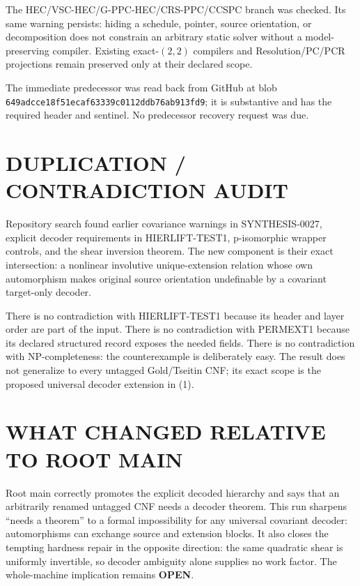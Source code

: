 \documentclass[11pt]{article}
\newcommand{\OPEN}{\textbf{OPEN}}
\begin{document}
The HEC/VSC-HEC/G-PPC-HEC/CRS-PPC/CCSPC branch was checked.  Its same warning
persists: hiding a schedule, pointer, source orientation, or decomposition
does not constrain an arbitrary static solver without a model-preserving
compiler.  Existing exact-$(2,2)$ compilers and Resolution/PC/PCR projections
remain preserved only at their declared scope.

The immediate predecessor
was read back from GitHub at blob
\texttt{649adcce18f51ecaf63339c0112ddb76ab913fd9}; it is substantive and has
the required header and sentinel.  No predecessor recovery request was due.

\section{DUPLICATION / CONTRADICTION AUDIT}
Repository search found earlier covariance warnings in SYNTHESIS-0027,
explicit decoder requirements in HIERLIFT-TEST1, p-isomorphic wrapper
controls, and the shear inversion theorem.  The new component is their exact
intersection: a nonlinear involutive unique-extension relation whose own
automorphism makes original source orientation undefinable by a covariant
target-only decoder.

There is no contradiction with HIERLIFT-TEST1 because its header and layer
order are part of the input.  There is no contradiction with PERMEXT1 because
its declared structured record exposes the needed fields.  There is no
contradiction with NP-completeness: the counterexample is deliberately easy.
The result does not generalize to every untagged Gold/Tseitin CNF; its exact
scope is the proposed universal decoder extension in (1).

\section{WHAT CHANGED RELATIVE TO ROOT MAIN}
Root main correctly promotes the explicit decoded hierarchy and says that an
arbitrarily renamed untagged CNF needs a decoder theorem.  This run sharpens
``needs a theorem'' to a formal impossibility for any universal covariant
decoder: automorphisms can exchange source and extension blocks.  It also
closes the tempting hardness repair in the opposite direction: the same
quadratic shear is uniformly invertible, so decoder ambiguity alone supplies
no work factor.  The whole-machine implication remains \OPEN{}.
\end{document}
